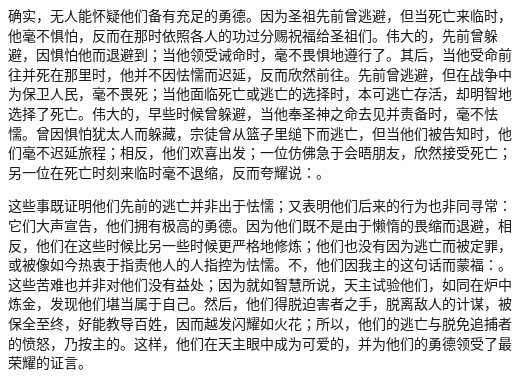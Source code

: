 \par

确实，无人能怀疑他们备有充足的勇德。因为圣祖先前曾逃避，但当死亡来临时，他毫不惧怕，反而在那时依照各人的功过分赐祝福给圣祖们。伟大的，先前曾躲避，因惧怕他而退避到；当他领受诫命时，毫不畏惧地遵行了。其后，当他受命前往并死在那里时，他并不因怯懦而迟延，反而欣然前往。先前曾逃避，但在战争中为保卫人民，毫不畏死；当他面临死亡或逃亡的选择时，本可逃亡存活，却明智地选择了死亡。伟大的，早些时候曾躲避，当他奉圣神之命去见并责备时，毫不怯懦。曾因惧怕犹太人而躲藏，宗徒曾从篮子里缒下而逃亡，但当他们被告知时，他们毫不迟延旅程；相反，他们欢喜出发；一位仿佛急于会晤朋友，欣然接受死亡；另一位在死亡时刻来临时毫不退缩，反而夸耀说：。\par

\par

这些事既证明他们先前的逃亡并非出于怯懦；又表明他们后来的行为也非同寻常：它们大声宣告，他们拥有极高的勇德。因为他们既不是由于懒惰的畏缩而退避，相反，他们在这些时候比另一些时候更严格地修炼；他们也没有因为逃亡而被定罪，或被像如今热衷于指责他人的人指控为怯懦。不，他们因我主的这句话而蒙福：。这些苦难也并非对他们没有益处；因为就如智慧所说，天主试验他们，如同在炉中炼金，发现他们堪当属于自己。然后，他们得脱迫害者之手，脱离敌人的计谋，被保全至终，好能教导百姓，因而越发闪耀如火花；所以，他们的逃亡与脱免追捕者的愤怒，乃按主的。这样，他们在天主眼中成为可爱的，并为他们的勇德领受了最荣耀的证言。\par

\par

